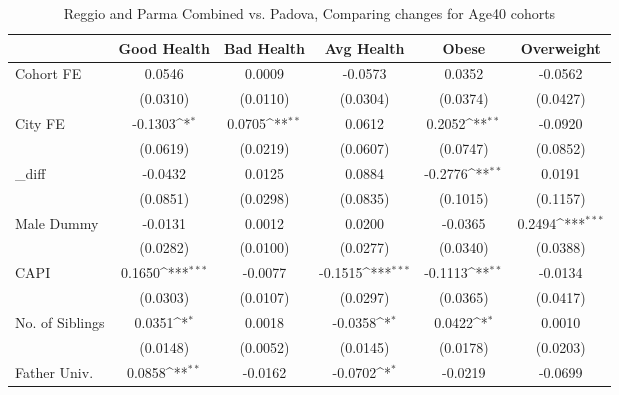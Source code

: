 \begin{table}[htbp]\centering
\def\sym#1{\ifmmode^{#1}\else\(^{#1}\)\fi}
\caption{Reggio and Parma Combined vs. Padova, Comparing changes for Age40 cohorts}
\begin{tabular}{l*{5}{c}}
\toprule
            &\multicolumn{1}{c}{Good Health}&\multicolumn{1}{c}{Bad Health}&\multicolumn{1}{c}{Avg Health}&\multicolumn{1}{c}{Obese}&\multicolumn{1}{c}{Overweight}\\
\midrule
Cohort FE   &      0.0546         &      0.0009         &     -0.0573         &      0.0352         &     -0.0562         \\
            &    (0.0310)         &    (0.0110)         &    (0.0304)         &    (0.0374)         &    (0.0427)         \\
\addlinespace
City FE     &     -0.1303\sym{*}  &      0.0705\sym{**} &      0.0612         &      0.2052\sym{**} &     -0.0920         \\
            &    (0.0619)         &    (0.0219)         &    (0.0607)         &    (0.0747)         &    (0.0852)         \\
\addlinespace
\_diff       &     -0.0432         &      0.0125         &      0.0884         &     -0.2776\sym{**} &      0.0191         \\
            &    (0.0851)         &    (0.0298)         &    (0.0835)         &    (0.1015)         &    (0.1157)         \\
\addlinespace
Male Dummy  &     -0.0131         &      0.0012         &      0.0200         &     -0.0365         &      0.2494\sym{***}\\
            &    (0.0282)         &    (0.0100)         &    (0.0277)         &    (0.0340)         &    (0.0388)         \\
\addlinespace
CAPI        &      0.1650\sym{***}&     -0.0077         &     -0.1515\sym{***}&     -0.1113\sym{**} &     -0.0134         \\
            &    (0.0303)         &    (0.0107)         &    (0.0297)         &    (0.0365)         &    (0.0417)         \\
\addlinespace
No. of Siblings&      0.0351\sym{*}  &      0.0018         &     -0.0358\sym{*}  &      0.0422\sym{*}  &      0.0010         \\
            &    (0.0148)         &    (0.0052)         &    (0.0145)         &    (0.0178)         &    (0.0203)         \\
\addlinespace
Father Univ.&      0.0858\sym{**} &     -0.0162         &     -0.0702\sym{*}  &     -0.0219         &     -0.0699         \\

\end{tabular}
\end{table}
